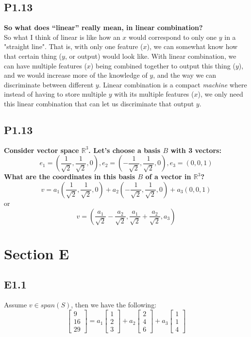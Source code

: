 \documentclass[12pt]{article}
\begin{document}
\subsection*{P1.13}
{\bfseries So what does “linear” really mean, in linear combination?}\\
So what I think of linear is like how an $x$ would correspond to only one $y$ in a "straight line". That is, with only one feature ($x$), we can somewhat know how that certain thing ($y$, or output) would look like. With linear combination, we can have multiple features ($x$) being combined together to output this thing ($y$), and we would increase more of the knowledge of $y$, and the way we can discriminate between different $y$. Linear combination is a compact \textit{machine} where instead of having to store multiple $y$ with its multiple features ($x$), we only need this linear combination that can let us discriminate that output $y$.

\subsection*{P1.13}
{\bfseries Consider vector space $\mathbb{R}^3$. Let's choose a basis $B$ with 3 vectors:
$$e_1=(\frac{1}{\sqrt{2}}, \frac{1}{\sqrt{2}},0), e_2=(-\frac{1}{\sqrt{2}}, \frac{1}{\sqrt{2}},0), e_3=(0,0,1)$$
What are the coordinates in this basis $B$ of a vector in $\mathbb{R}^3$?}
$$v=a_1(\frac{1}{\sqrt{2}}, \frac{1}{\sqrt{2}},0)+a_2(-\frac{1}{\sqrt{2}}, \frac{1}{\sqrt{2}},0)+a_3(0,0,1)$$
or
$$v=(\frac{a_1}{\sqrt{2}}-\frac{a_2}{\sqrt{2}},\frac{a_1}{\sqrt{2}}+\frac{a_2}{\sqrt{2}},a_3)$$
\section*{Section E}
\subsection*{E1.1}
Assume $v \in span(S)$, then we have the following:
$$ \begin{bmatrix}
9\\
16\\
29
\end{bmatrix}= a_1\begin{bmatrix}
1\\
2\\
3
\end{bmatrix} + a_2\begin{bmatrix}
2\\
4\\
6
\end{bmatrix} + a_3\begin{bmatrix}
1\\
1\\
4
\end{bmatrix}$$
\end{document}

